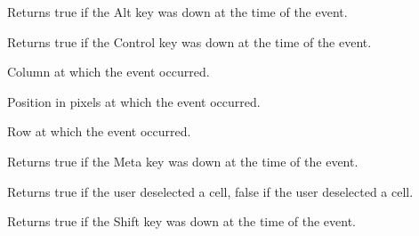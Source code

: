 Returns true if the Alt key was down at the time of the event.

\label{wxgrideventcontroldown}


Returns true if the Control key was down at the time of the event.

\label{wxgrideventgetcol}


Column at which the event occurred.

\label{wxgrideventgetposition}


Position in pixels at which the event occurred.

\label{wxgrideventgetrow}


Row at which the event occurred.

\label{wxgrideventmetadown}


Returns true if the Meta key was down at the time of the event.

\label{wxgrideventselecting}


Returns true if the user deselected a cell, false if the user
deselected a cell.

\label{wxgrideventshiftdown}


Returns true if the Shift key was down at the time of the event.

\section{}\label{wxgridrangeselectevent}


\\
\\
\\

